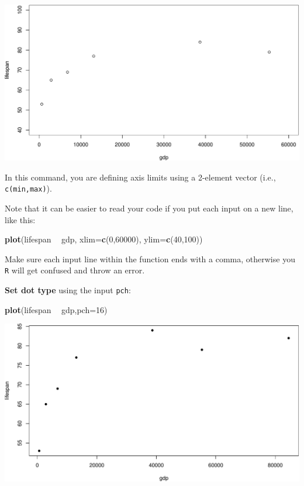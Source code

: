 \documentclass[
]{book}
\newenvironment{Shaded}{\begin{snugshade}}{\end{snugshade}}
\newcommand{\DataTypeTok}[1]{\textcolor[rgb]{0.13,0.29,0.53}{#1}}
\newcommand{\DecValTok}[1]{\textcolor[rgb]{0.00,0.00,0.81}{#1}}
\newcommand{\KeywordTok}[1]{\textcolor[rgb]{0.13,0.29,0.53}{\textbf{#1}}}
\newcommand{\NormalTok}[1]{#1}
\newcommand{\OperatorTok}[1]{\textcolor[rgb]{0.81,0.36,0.00}{\textbf{#1}}}
\newcommand{\StringTok}[1]{\textcolor[rgb]{0.31,0.60,0.02}{#1}}
\begin{document}
\includegraphics{figures/unnamed-chunk-102-1.pdf}

In this command, you are defining axis limits using a 2-element vector (i.e., \texttt{c(min,max)}).

Note that it can be easier to read your code if you put each input on a new line, like this:

\begin{Shaded}
\begin{Highlighting}[]
\KeywordTok{plot}\NormalTok{(lifespan }\OperatorTok{~}\StringTok{ }\NormalTok{gdp,}
     \DataTypeTok{xlim=}\KeywordTok{c}\NormalTok{(}\DecValTok{0}\NormalTok{,}\DecValTok{60000}\NormalTok{),}
     \DataTypeTok{ylim=}\KeywordTok{c}\NormalTok{(}\DecValTok{40}\NormalTok{,}\DecValTok{100}\NormalTok{))}
\end{Highlighting}
\end{Shaded}

Make sure each input line within the function ends with a comma, otherwise you \texttt{R} will get confused and throw an error.

\textbf{Set dot type} using the input \texttt{pch}:

\begin{Shaded}
\begin{Highlighting}[]
\KeywordTok{plot}\NormalTok{(lifespan }\OperatorTok{~}\StringTok{ }\NormalTok{gdp,}\DataTypeTok{pch=}\DecValTok{16}\NormalTok{)}
\end{Highlighting}
\end{Shaded}

\includegraphics{figures/unnamed-chunk-104-1.pdf}
\end{document}
